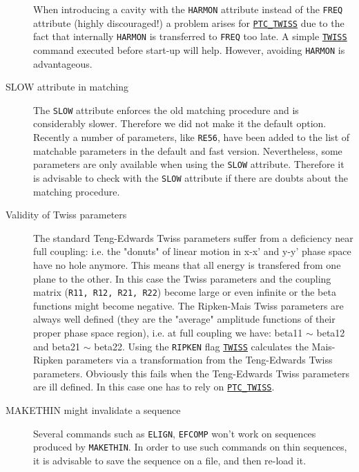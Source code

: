 \begin{description}
  When introducing a cavity with the \texttt{HARMON} attribute instead
  of the \texttt{FREQ} attribute (highly discouraged!) a problem arises
  for  \hyperref[sec:ptc-twiss]{\texttt{PTC\_TWISS}} due to the fact that
  internally \texttt{HARMON} is transferred to \texttt{FREQ} too late. A
  simple \hyperref[chap:twiss]{\texttt{TWISS}} command executed before \ptc
  start-up will help. However, avoiding \texttt{HARMON} is advantageous.
    

\item[SLOW attribute in matching] 
  The \texttt{SLOW} attribute enforces the old matching procedure and is
  considerably slower. Therefore we did not make it the default
  option. Recently a number of parameters, like \texttt{RE56}, have been
  added to the list of matchable parameters in the default and fast
  version. Nevertheless, some parameters are only available when using
  the \texttt{SLOW} attribute. Therefore it is advisable to check with the
  \texttt{SLOW} attribute if there are doubts about the matching procedure.  


\item[Validity of Twiss parameters]
  The standard Teng-Edwards Twiss parameters suffer from a deficiency near
  full coupling: i.e. the "donuts" of linear motion in x-x' and y-y' phase
  space have no hole anymore. This means that all energy is transfered
  from one plane to the other. In this case the Twiss parameters and the
  coupling matrix (\texttt{R11, R12, R21, R22}) become large or even infinite or
  the beta functions might become negative. The Ripken-Mais Twiss
  parameters are always well defined (they are the "average" amplitude
  functions of their proper phase space region), i.e. at full coupling we
  have: beta11 $\sim$ beta12 and beta21 $\sim$ beta22. Using the \texttt{RIPKEN}
  flag \hyperref[chap:twiss]{\texttt{TWISS}} calculates the Mais-Ripken
  parameters via a transformation from the Teng-Edwards Twiss
  parameters. Obviously this fails when the Teng-Edwards Twiss
  parameters are ill defined. In this case one has to rely on
  \hyperref[chap:ptc-twiss]{\texttt{PTC\_TWISS}}.    
  \item[MAKETHIN might invalidate a sequence]
   Several \madx commands such as {\texttt{ELIGN}}, {\texttt{EFCOMP}} won't work on sequences produced by {\texttt{MAKETHIN}}. In order to use such commands on thin sequences, it is advisable to save the sequence on a file, and then re-load it.
   
   
\end{description}



